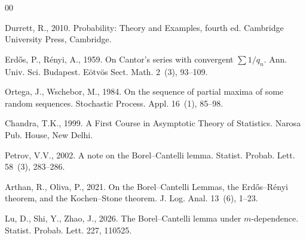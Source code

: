 \documentclass[11pt]{article}
\begin{document}
\begin{thebibliography}{00}

Durrett, R., 2010. Probability: Theory and Examples, fourth ed.
Cambridge University Press, Cambridge.

Erd\H{o}s, P., R\'enyi, A., 1959. On Cantor's series with convergent
$\sum 1/q_n$. Ann. Univ. Sci. Budapest. E\"otv\"os Sect. Math. 2~(3), 93--109.

Ortega, J., Wschebor, M., 1984. On the sequence of partial maxima of some
random sequences. Stochastic Process. Appl. 16~(1), 85--98.

Chandra, T.K., 1999. A First Course in Asymptotic Theory of Statistics.
Narosa Pub. House, New Delhi.

Petrov, V.V., 2002. A note on the Borel--Cantelli lemma.
Statist. Probab. Lett. 58~(3), 283--286.

Arthan, R., Oliva, P., 2021. On the Borel--Cantelli Lemmas, the
Erd\H{o}s--R\'enyi theorem, and the Kochen--Stone theorem.
J. Log. Anal. 13~(6), 1--23.

Lu, D., Shi, Y., Zhao, J., 2026. The Borel--Cantelli lemma under
$m$-dependence. Statist. Probab. Lett. 227, 110525.

\end{thebibliography}
\end{document}
